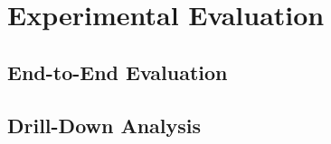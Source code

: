 \section{Experimental Evaluation}

\subsection{End-to-End Evaluation}

\subsection{Drill-Down Analysis}